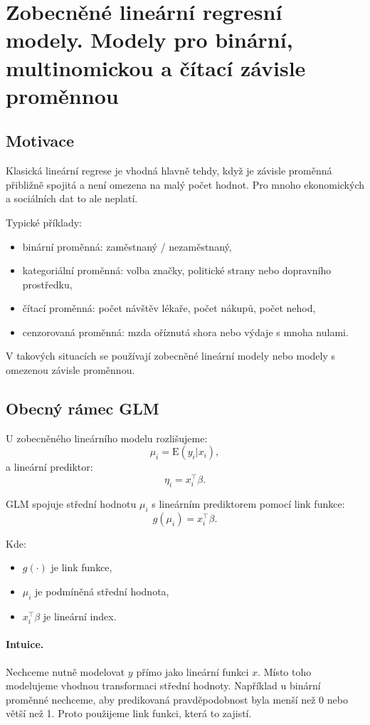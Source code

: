 \section{Zobecněné lineární regresní modely. Modely pro binární, multinomickou a čítací závisle proměnnou}

\subsection{Motivace}

Klasická lineární regrese je vhodná hlavně tehdy, když je závisle proměnná přibližně spojitá a není omezena
na malý počet hodnot. Pro mnoho ekonomických a sociálních dat to ale neplatí.

Typické příklady:
\begin{itemize}
    \item binární proměnná: zaměstnaný / nezaměstnaný,
    \item kategoriální proměnná: volba značky, politické strany nebo dopravního prostředku,
    \item čítací proměnná: počet návštěv lékaře, počet nákupů, počet nehod,
    \item cenzorovaná proměnná: mzda oříznutá shora nebo výdaje s mnoha nulami.
\end{itemize}

V takových situacích se používají zobecněné lineární modely nebo modely s omezenou závisle proměnnou.

\subsection{Obecný rámec GLM}

U zobecněného lineárního modelu rozlišujeme:
\[
\mu_i=\mathrm{E}(y_i|x_i),
\]
a lineární prediktor:
\[
\eta_i=x_i^\top\beta.
\]

GLM spojuje střední hodnotu $\mu_i$ s lineárním prediktorem pomocí link funkce:
\[
g(\mu_i)=x_i^\top\beta.
\]

Kde:
\begin{itemize}
    \item $g(\cdot)$ je link funkce,
    \item $\mu_i$ je podmíněná střední hodnota,
    \item $x_i^\top\beta$ je lineární index.
\end{itemize}

\paragraph{Intuice.}
Nechceme nutně modelovat $y$ přímo jako lineární funkci $x$. Místo toho modelujeme vhodnou transformaci
střední hodnoty. Například u binární proměnné nechceme, aby predikovaná pravděpodobnost byla menší než 0
nebo větší než 1. Proto použijeme link funkci, která to zajistí.

